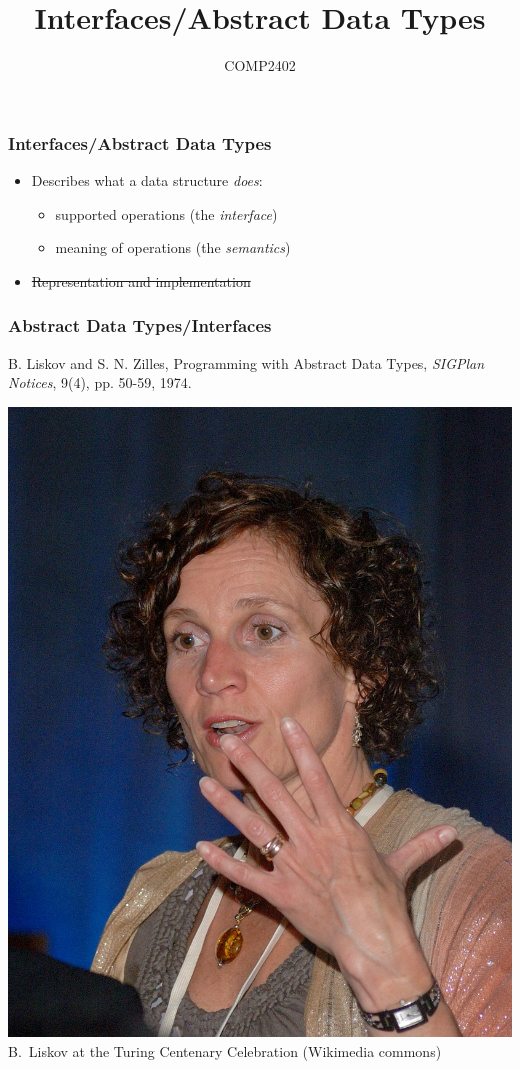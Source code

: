 \documentclass[aspectratio=169,xcolor=dvipsnames]{beamer}
\title{Interfaces/Abstract Data Types}
\author{COMP2402}
\date{}
\begin{document}
\begin{frame}
  \titlepage
\end{frame}

\begin{frame}
  \frametitle{Interfaces/Abstract Data Types}
 
  \begin{itemize}
   \item<+->Describes what a data structure \emph{does}:
     \begin{itemize}
        \item<+->supported operations (the \emph{interface})
        \item<+->meaning of operations (the \emph{semantics})
     \end{itemize}
   \item<+-> \sout{Representation and implementation}
        \end{itemize}
\end{frame}

\begin{frame}
  \frametitle{Abstract Data Types/Interfaces}

   B. Liskov and S. N. Zilles, Programming with Abstract Data Types, \emph{SIGPlan Notices}, 9(4), pp. 50-59, 1974.\\
  \begin{center}
   \includegraphics[height=.6\textheight]{images/liskov}\\
   B.~Liskov at the Turing Centenary Celebration (Wikimedia commons)
  \end{center}
\end{frame}
\end{document}
